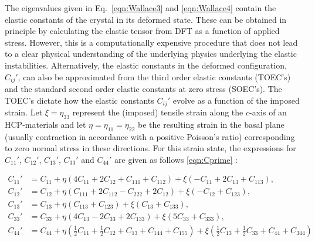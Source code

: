 \documentclass[showpacs,aps,floatfix,prb,reprint,superscriptaddress]{revtex4-1}
\begin{document}
The eigenvalues given in Eq.~\ref{eqn:Wallace3} and \ref{eqn:Wallace4} contain the elastic constants of the crystal in its deformed state. These can be obtained in principle by calculating the elastic tensor from DFT as a function of applied stress. However, this is a computationally expensive procedure that does not lead to a clear physical understanding of the underlying physics underlying the elastic instabilities. Alternatively, the elastic constants in the deformed configuration, $C_{ij}'$, can also be approximated from the third order elastic constants (TOEC's) and the standard second order elastic constants at zero stress (SOEC's).
The TOEC's dictate how the elastic constants $C_{ij}'$ evolve as a function of the imposed strain. Let $\xi = \eta_{33}$ represent the (imposed) tensile strain along the $c$-axis of an HCP-materials and let $\eta = \eta_{11} = \eta_{22}$ be the resulting strain in the basal plane (usually contraction in accordance with a positive Poisson's ratio) corresponding to zero normal stress in these directions. For this strain state, the expressions for $C_{11}'$, $C_{12}'$, $C_{13}'$, $C_{33}'$ and $C_{44}'$ are given as follows \ref{eqn:Cprime} \cite{rao1969third,rao1974anderson}:
 \begin{widetext}
\begin{subequations}
\label{eqn:Cprime} 
\begin{align}
        C_{11}' &=C_{11} + \eta \left(4 C_{11} + 2C_{12} + C_{111} + C_{112}\right) + \xi \left(-C_{11} + 2C_{13} + C_{113}\right),\\
        C_{12}' &=C_{12} + \eta \left(C_{111} + 2C_{112} - C_{222} + 2C_{12}\right) + \xi \left(-C_{12} + C_{123}\right),\\
				C_{13}' &=C_{13} + \eta \left(C_{113} + C_{123} \right) + \xi \left(C_{13} + C_{133}\right),\\
				C_{33}' &=C_{33} + \eta \left(4C_{13} - 2C_{33} + 2C_{133} \right) + \xi \left(5C_{33} + C_{333}\right),\\
				C_{44}' &=C_{44} + \eta \left(\frac{1}{2} C_{11} + \frac{1}{2} C_{12} + C_{13} + C_{144} + C_{155} \right) + \xi \left(\frac{1}{2} C_{13} + \frac{1}{2} C_{33} + C_{44} + C_{344}\right)
\end{align}
\end{subequations}
\end{widetext}
\end{document}
